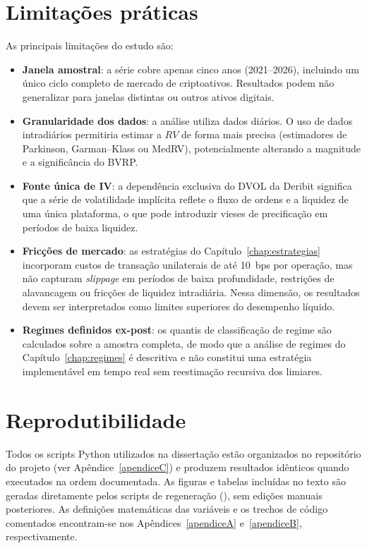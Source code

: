 \section*{Limitações práticas}

As principais limitações do estudo são:

\begin{itemize}
    \item \textbf{Janela amostral}: a série cobre apenas cinco anos (2021--2026),
    incluindo um único ciclo completo de mercado de criptoativos. Resultados
    podem não generalizar para janelas distintas ou outros ativos digitais.

    \item \textbf{Granularidade dos dados}: a análise utiliza dados diários. O
    uso de dados intradiários permitiria estimar a $RV$ de forma mais precisa
    (estimadores de Parkinson, Garman--Klass ou MedRV), potencialmente
    alterando a magnitude e a significância do BVRP.

    \item \textbf{Fonte única de IV}: a dependência exclusiva do DVOL da Deribit
    significa que a série de volatilidade implícita reflete o fluxo de ordens e
    a liquidez de uma única plataforma, o que pode introduzir vieses de
    precificação em períodos de baixa liquidez.

    \item \textbf{Fricções de mercado}: as estratégias do
    Capítulo~\ref{chap:estrategias} incorporam custos de transação
    unilaterais de até 10~bps por operação, mas não capturam
    \textit{slippage} em períodos de baixa profundidade, restrições de
    alavancagem ou fricções de liquidez intradiária. Nessa dimensão, os
    resultados devem ser interpretados como limites superiores do
    desempenho líquido.

    \item \textbf{Regimes definidos ex-post}: os quantis de classificação de
    regime são calculados sobre a amostra completa, de modo que a análise de
    regimes do Capítulo~\ref{chap:regimes} é descritiva e não constitui uma
    estratégia implementável em tempo real sem reestimação recursiva dos
    limiares.
\end{itemize}

\section*{Reprodutibilidade}

Todos os scripts Python utilizados na dissertação estão organizados no
repositório do projeto (ver Apêndice~\ref{apendiceC}) e produzem resultados
idênticos quando executados na ordem documentada. As figuras e tabelas
incluídas no texto são geradas diretamente pelos scripts de regeneração
(), sem edições manuais posteriores.
As definições matemáticas das variáveis e os trechos de código comentados
encontram-se nos Apêndices~\ref{apendiceA} e~\ref{apendiceB}, respectivamente.
